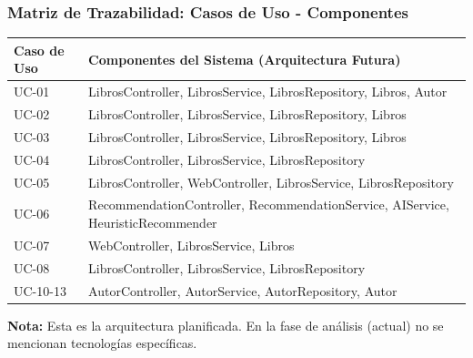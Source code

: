 \documentclass[aspectratio=169]{beamer}
\begin{document}
\begin{frame}
\frametitle{Matriz de Trazabilidad: Casos de Uso - Componentes}

\begin{table}
\centering
\tiny
\begin{tabular}{p{2.5cm}p{10cm}}
\toprule
\textbf{Caso de Uso} & \textbf{Componentes del Sistema (Arquitectura Futura)} \\
\midrule
UC-01 & LibrosController, LibrosService, LibrosRepository, Libros, Autor \\
UC-02 & LibrosController, LibrosService, LibrosRepository, Libros \\
UC-03 & LibrosController, LibrosService, LibrosRepository, Libros \\
UC-04 & LibrosController, LibrosService, LibrosRepository \\
UC-05 & LibrosController, WebController, LibrosService, LibrosRepository \\
UC-06 & RecommendationController, RecommendationService, AIService, HeuristicRecommender \\
UC-07 & WebController, LibrosService, Libros \\
UC-08 & LibrosController, LibrosService, LibrosRepository \\
UC-10-13 & AutorController, AutorService, AutorRepository, Autor \\
\bottomrule
\end{tabular}
\end{table}

\vspace{0.3cm}

\textbf{Nota:} Esta es la arquitectura planificada. En la fase de análisis (actual) no se mencionan tecnologías específicas.

\end{frame}
\end{document}
